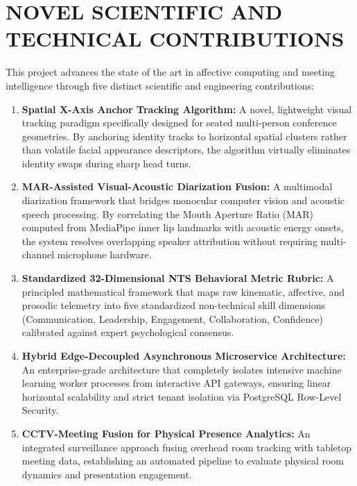 \documentclass[12pt,a4paper,oneside]{report}
\begin{document}
\section{NOVEL SCIENTIFIC AND TECHNICAL CONTRIBUTIONS}
This project advances the state of the art in affective computing and meeting intelligence through five distinct scientific and engineering contributions:
\begin{enumerate}
    \item \textbf{Spatial X-Axis Anchor Tracking Algorithm:} A novel, lightweight visual tracking paradigm specifically designed for seated multi-person conference geometries. By anchoring identity tracks to horizontal spatial clusters rather than volatile facial appearance descriptors, the algorithm virtually eliminates identity swaps during sharp head turns.
    \item \textbf{MAR-Assisted Visual-Acoustic Diarization Fusion:} A multimodal diarization framework that bridges monocular computer vision and acoustic speech processing. By correlating the Mouth Aperture Ratio (MAR) computed from MediaPipe inner lip landmarks with acoustic energy onsets, the system resolves overlapping speaker attribution without requiring multi-channel microphone hardware.
    \item \textbf{Standardized 32-Dimensional NTS Behavioral Metric Rubric:} A principled mathematical framework that maps raw kinematic, affective, and prosodic telemetry into five standardized non-technical skill dimensions (Communication, Leadership, Engagement, Collaboration, Confidence) calibrated against expert psychological consensus.
    \item \textbf{Hybrid Edge-Decoupled Asynchronous Microservice Architecture:} An enterprise-grade architecture that completely isolates intensive machine learning worker processes from interactive API gateways, ensuring linear horizontal scalability and strict tenant isolation via PostgreSQL Row-Level Security.
    \item \textbf{CCTV-Meeting Fusion for Physical Presence Analytics:} An integrated surveillance approach fusing overhead room tracking with tabletop meeting data, establishing an automated pipeline to evaluate physical room dynamics and presentation engagement.
\end{enumerate}
\end{document}
